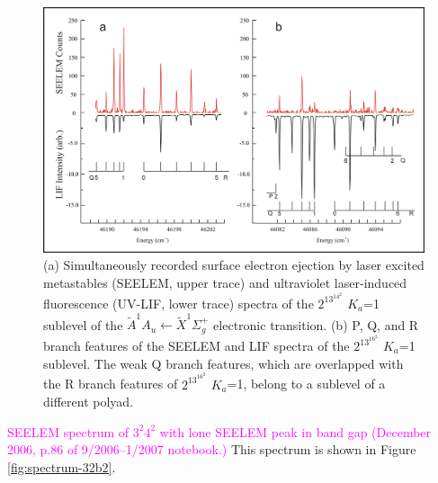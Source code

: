 \documentclass[12pt,draft]{mitthesis}
\newcommand{\POINT}[1]{\textcolor{magenta}{#1}}
\begin{document}
\begin{figure}
  \caption{
    (a) Simultaneously recorded surface electron ejection by laser 
    excited metastables (SEELEM, upper trace) and ultraviolet 
    laser-induced fluorescence (UV-LIF, lower trace) spectra of the 
    $2^13^14^2$ $K_a$=1 sublevel of the $\tilde{A}^1A_u \leftarrow
    \tilde{X} ^1\Sigma_g^+$ electronic transition.  (b) P, Q, and R
    branch features of the SEELEM and LIF spectra of the $2^13^16^2$ 
    $K_a$=1 sublevel. The weak Q branch features, which are overlapped 
    with the R branch features of $2^13^16^2$ $K_a$=1, belong to a 
    sublevel of a different polyad.
  }
  \label{fig:spectrum-2131b2}
  \centering
  \includegraphics[width=7.5in,angle=90]{spectrum-2131b2.png}
\end{figure}

\POINT{SEELEM spectrum of $3^2 4^2$ with lone SEELEM peak in band gap
  (December 2006, p.86 of 9/2006--1/2007 notebook.)}  This spectrum is
shown in Figure \ref{fig:spectrum-32b2}.
\end{document}
